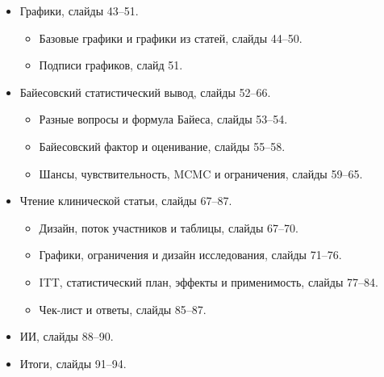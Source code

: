 \documentclass[11pt,a4paper]{article}
\begin{document}
\begin{itemize}
\begin{itemize}
  \end{itemize}
\item Графики, слайды 43--51.
  \begin{itemize}
    \item Базовые графики и графики из статей, слайды 44--50.
    \item Подписи графиков, слайд 51.
  \end{itemize}
\item Байесовский статистический вывод, слайды 52--66.
  \begin{itemize}
    \item Разные вопросы и формула Байеса, слайды 53--54.
    \item Байесовский фактор и оценивание, слайды 55--58.
    \item Шансы, чувствительность, MCMC и ограничения, слайды 59--65.
  \end{itemize}
\item Чтение клинической статьи, слайды 67--87.
  \begin{itemize}
    \item Дизайн, поток участников и таблицы, слайды 67--70.
    \item Графики, ограничения и дизайн исследования, слайды 71--76.
    \item ITT, статистический план, эффекты и применимость, слайды 77--84.
    \item Чек-лист и ответы, слайды 85--87.
  \end{itemize}
\item ИИ, слайды 88--90.
\item Итоги, слайды 91--94.
\end{itemize}
\end{document}
